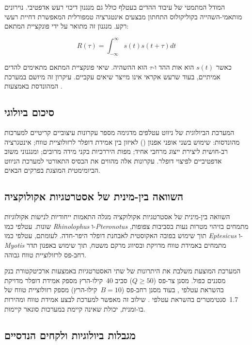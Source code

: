 המודל המתמטי של עיבוד ההדים בעטלף כולל גם מנגנון דיכוי רעש אדפטיבי. נוירונים מותאמי-השהייה בקוליקולוס התחתון מבצעים אינטגרציה טמפורלית המאפשרת דחיית רעשי רקע. מנגנון זה מתואר על ידי פונקציית המתאם:

\begin{equation}
R(\tau) = \int_{-\infty}^{\infty} s(t) s(t + \tau) dt
\label{eq:ch02_correlation}
\end{equation}

כאשר $s(t)$ הוא אות ההד ו-$\tau$ הוא ההשהיה. שיאי פונקציית המתאם מתאימים להדים אמיתיים, בעוד שרעש אקראי אינו מייצר שיאים עקביים. עיקרון זה מיושם במערכת המהונדסת באמצעות .

\subsection{סיכום ביולוגי}
\label{sec:bio_summary}

המערכת הביולוגית של ניווט עטלפים מדגימה מספר עקרונות עיצוביים קריטיים למערכות מהונדסות: שימוש בשני אופני אפנון () לאיזון בין אמידת דופלר לרזולוציית טווח; אינטגרציה רב-חושית ליצירת ייצוג מרחבי אחיד; מפות היררכיות בקני מידה מרובים; ומנגנוני משוב אדפטיביים לפיצוי דופלר. עקרונות אלה מהווים את הבסיס התאורטי למערכת הניווט הביומימטית המוצגת בפרקים הבאים.

\subsection{השוואה בין-מינית של אסטרטגיות אקולוקציה}
\label{sec:cross_species}

השוואה בין-מינית של אסטרטגיות אקולוקציה מגלה התאמות ייחודיות לנישות אקולוגיות שונות. עטלפי  כמו \textit{Rhinolophus} ו-\textit{Pteronotus} מתמחים בזיהוי מטרות נעות בסביבות צפופות, תוך שימוש בפובה האקוסטית לאבחנת דופלר היפר-חדה. לעומתם, עטלפי  כמו \textit{Eptesicus} ו-\textit{Myotis} מתמחים באמידת טווח מדויקת ובסיווג מרקם משטח, תוך שימוש באפנון תדר רחב-פס לרזולוציית טווח גבוהה.

המערכת המוצעת משלבת את היתרונות של שתי האסטרטגיות באמצעות ארכיטקטורת בנק מסננים כפול. מסנן צר-פס ($Q \geq 50$) סביב 40~קילו-הרץ מספק אמידת דופלר מדויקת בהשראת עטלפי , בעוד מסנן רחב-פס ($B = 10$~קילו-הרץ) מספק רזולוציית טווח של 1.7~סנטימטרים בהשראת עטלפי . שילוב זה מאפשר למערכת לבצע אמידת טווח ומהירות בו-זמנית, יכולת שאינה קיימת במערכות סונאר קיימות.

\subsection{מגבלות ביולוגיות ולקחים הנדסיים}
\label{sec:bio_limitations}

